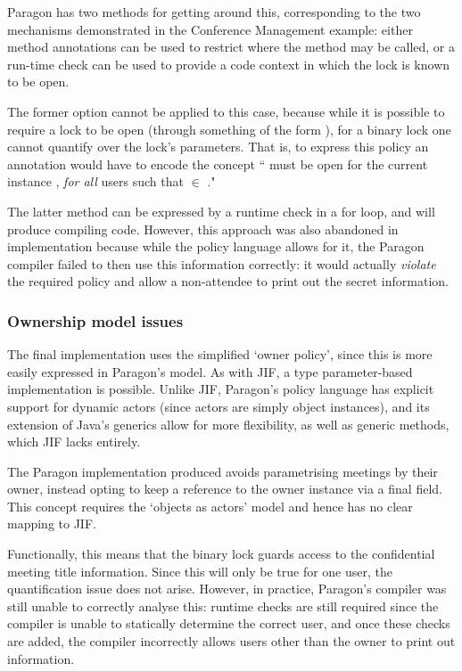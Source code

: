 Paragon has two methods for getting around this, corresponding to the two mechanisms demonstrated in the Conference Management example: either method annotations can be used to restrict where the method may be called, or a run-time check can be used to provide a code context in which the lock is known to be open.

The former option cannot be applied to this case, because while it is possible to require a lock to be open (through something of the form ), for a binary lock one cannot quantify over the lock's parameters. That is, to express this policy an annotation would have to encode the concept `` must be open for the current instance , \textit{for all} users  such that  $ \in $ ."

The latter method can be expressed by a runtime check in a for loop, and will produce compiling code. However, this approach was also abandoned in implementation because while the policy language allows for it, the Paragon compiler failed to then use this information correctly: it would actually \textit{violate} the required policy and allow a non-attendee to print out the secret information.


\subsubsection{Ownership model issues}

The final implementation uses the simplified `owner policy', since this is more easily expressed in Paragon's model. As with JIF, a type parameter-based implementation is possible. Unlike JIF, Paragon's policy language has explicit support for dynamic actors (since actors are simply object instances), and its extension of Java's generics allow for more flexibility, as well as generic methods, which JIF lacks entirely.

The Paragon implementation produced avoids parametrising meetings by their owner, instead opting to keep a reference to the owner instance via a final field. This concept requires the `objects as actors' model and hence has no clear mapping to JIF.

Functionally, this means that the binary lock  guards access to the confidential meeting title information. Since this will only be true for one user, the quantification issue does not arise. However, in practice, Paragon's compiler was still unable to correctly analyse this: runtime checks are still required since the compiler is unable to statically determine the correct user, and once these checks are added, the compiler incorrectly allows users other than the owner to print out information.


